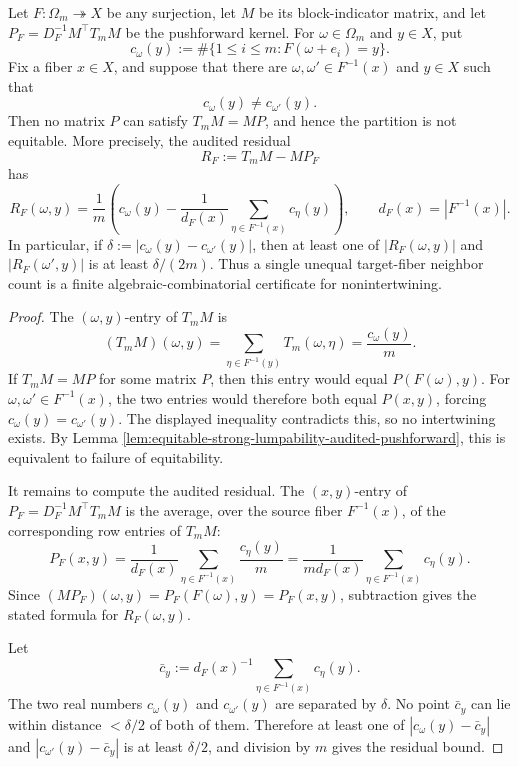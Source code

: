 \begin{theorem}\label{thm:local-residual-certificate-hypercube-folds}
Let \(F:\Omega_m\twoheadrightarrow X\) be any surjection, let \(M\) be its block-indicator matrix, and let \(P_F=D_F^{-1}M^\top T_mM\) be the pushforward kernel.  For \(\omega\in\Omega_m\) and \(y\in X\), put
\[
c_\omega(y):=\#\{1\le i\le m:F(\omega+e_i)=y\}.
\]
Fix a fiber \(x\in X\), and suppose that there are \(\omega,\omega'\in F^{-1}(x)\) and \(y\in X\) such that
\[
c_\omega(y)\ne c_{\omega'}(y).
\]
Then no matrix \(P\) can satisfy \(T_mM=MP\), and hence the partition is not equitable.  More precisely, the audited residual
\[
R_F:=T_mM-MP_F
\]
has
\[
R_F(\omega,y)=\frac{1}{m}\left(c_\omega(y)-\frac{1}{d_F(x)}\sum_{\eta\in F^{-1}(x)}c_\eta(y)\right),
\qquad d_F(x)=|F^{-1}(x)|.
\]
In particular, if \(\delta:=|c_\omega(y)-c_{\omega'}(y)|\), then at least one of \(|R_F(\omega,y)|\) and \(|R_F(\omega',y)|\) is at least \(\delta/(2m)\).  Thus a single unequal target-fiber neighbor count is a finite algebraic-combinatorial certificate for nonintertwining.
\end{theorem}

\begin{proof}
The \((\omega,y)\)-entry of \(T_mM\) is
\[
(T_mM)(\omega,y)=\sum_{\eta\in F^{-1}(y)}T_m(\omega,\eta)=\frac{c_\omega(y)}{m}.
\]
If \(T_mM=MP\) for some matrix \(P\), then this entry would equal \(P(F(\omega),y)\).  For \(\omega,\omega'\in F^{-1}(x)\), the two entries would therefore both equal \(P(x,y)\), forcing \(c_\omega(y)=c_{\omega'}(y)\).  The displayed inequality contradicts this, so no intertwining exists.  By Lemma \ref{lem:equitable-strong-lumpability-audited-pushforward}, this is equivalent to failure of equitability.

It remains to compute the audited residual.  The \((x,y)\)-entry of \(P_F=D_F^{-1}M^\top T_mM\) is the average, over the source fiber \(F^{-1}(x)\), of the corresponding row entries of \(T_mM\):
\[
P_F(x,y)=\frac{1}{d_F(x)}\sum_{\eta\in F^{-1}(x)}\frac{c_\eta(y)}{m}
=\frac{1}{m d_F(x)}\sum_{\eta\in F^{-1}(x)}c_\eta(y).
\]
Since \((MP_F)(\omega,y)=P_F(F(\omega),y)=P_F(x,y)\), subtraction gives the stated formula for \(R_F(\omega,y)\).

Let
\[
\bar c_y:=d_F(x)^{-1}\sum_{\eta\in F^{-1}(x)}c_\eta(y).
\]
The two real numbers \(c_\omega(y)\) and \(c_{\omega'}(y)\) are separated by \(\delta\).  No point \(\bar c_y\) can lie within distance \(<\delta/2\) of both of them.  Therefore at least one of \(|c_\omega(y)-\bar c_y|\) and \(|c_{\omega'}(y)-\bar c_y|\) is at least \(\delta/2\), and division by \(m\) gives the residual bound. \qedhere
\end{proof}

